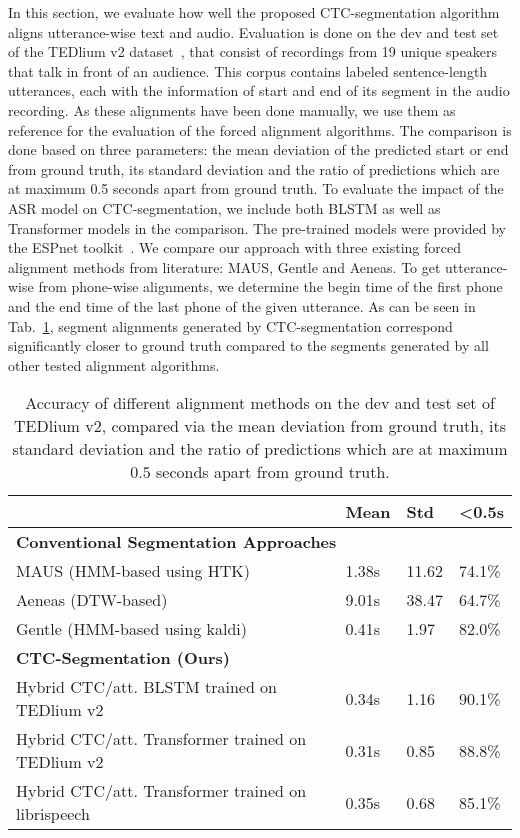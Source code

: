 \documentclass[runningheads]{llncs}
\begin{document}
In this section, we evaluate how well the proposed CTC-segmentation algorithm aligns utterance-wise text and audio.
Evaluation is done on the dev and test set of the TEDlium v2 dataset~\cite{Rousseau2014}, that consist of recordings from 19 unique speakers that talk in front of an audience.
This corpus contains labeled sentence-length utterances, each with the information of start and end of its segment in the audio recording.
As these alignments have been done manually, we use them as reference for the evaluation of the forced alignment algorithms.
The comparison is done based on three parameters:
the mean deviation of the predicted start or end from ground truth, its standard deviation and the ratio of predictions which are at maximum 0.5 seconds apart from ground truth.
To evaluate the impact of the ASR model on CTC-segmentation, we include both BLSTM as well as Transformer models in the comparison.
The pre-trained models were provided by the ESPnet toolkit~\cite{Watanabe2018}.
We compare our approach with three existing forced alignment methods from literature: MAUS, Gentle and Aeneas.
To get utterance-wise from phone-wise alignments, we determine the begin time of the first phone and the end time of the last phone of the given utterance.
As can be seen in Tab.~\ref{table:align_results}, segment alignments generated by CTC-segmentation correspond significantly closer to ground truth compared to the segments generated by all other tested alignment algorithms.


\begin{table}[tpb]
	\centering
	\caption{Accuracy of different alignment methods on the dev and test set of TEDlium v2,
	compared via the mean deviation from ground truth, its standard deviation and the ratio of predictions which are at maximum $0.5$ seconds apart from ground truth.}
	\begin{tabular}{l |l |l| l}\toprule
    & \textbf{Mean} & \textbf{Std} & \textbf{<0.5s}  \\ 
    \midrule
    \multicolumn{4}{l}{\textbf{Conventional Segmentation Approaches}} \\
    \midrule
	MAUS (HMM-based using HTK) & 1.38s & 11.62 & 74.1\% \\
	Aeneas (DTW-based) & 9.01s & 38.47 & 64.7\% \\
	Gentle (HMM-based using kaldi) & 0.41s & 1.97 & 82.0\% \\ 
	\midrule
	\multicolumn{4}{l}{\textbf{CTC-Segmentation (Ours)}} \\
    \midrule
	Hybrid CTC/att. BLSTM trained on TEDlium v2 & 0.34s & 1.16 & 90.1\% \\
	Hybrid CTC/att. Transformer trained on TEDlium v2 & 0.31s & 0.85 & 88.8\% \\
	Hybrid CTC/att. Transformer trained on librispeech & 0.35s & 0.68 & 85.1\% \\
	\bottomrule 
    \end{tabular}
	\label{table:align_results}
\end{table}
\end{document}

